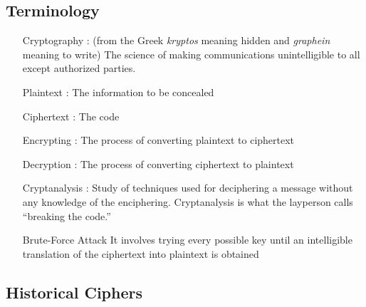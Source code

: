 \documentclass{article}
\begin{document}
\subsection{Terminology}
\begin{itemize}
    \item[Cryptography]: (from the Greek {\it kryptos} meaning hidden and {\it graphein} meaning to write) The
    science of making communications unintelligible to all except authorized parties.
    \item[Plaintext]: The information to be concealed
    \item[Ciphertext]: The code
    \item[Encrypting]: The process of converting plaintext to ciphertext 
    \item[Decryption]: The process of converting ciphertext to plaintext
    \item[Cryptanalysis]: Study of techniques used for deciphering a message without any knowledge of the enciphering. Cryptanalysis is what the layperson calls “breaking the code.”
    \item[Brute-Force Attack] It involves trying every possible key until an intelligible translation of the ciphertext into plaintext is obtained
\end{itemize}

\subsection{Historical Ciphers}
\end{document}
